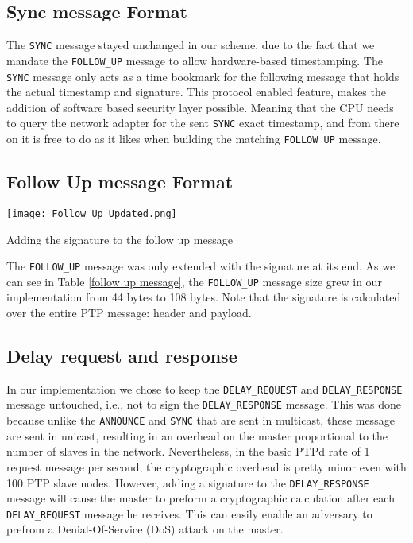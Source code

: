 \documentclass[11pt]{article}
\begin{document}
\subsection{Sync message Format}\label{sol:sync}

The \texttt{SYNC} message stayed unchanged in our scheme, due to the fact that we mandate the \texttt{FOLLOW_UP} message to allow hardware-based timestamping. The \texttt{SYNC} message only acts as a time bookmark for the following message that holds the actual timestamp and signature. This protocol enabled feature, makes the addition of software based security layer possible. Meaning that the CPU needs to query the network adapter for the sent \texttt{SYNC} exact timestamp, and from there on it is free to do as it likes when building the matching \texttt{FOLLOW_UP} message.



\subsection{Follow Up message Format}\label{sol:fu}



\begin{table}[t]

\centerline{\texttt{[image: Follow\_Up\_Updated.png]}}

\caption{Adding the signature to the follow up message}

\label{follow up message}

\end{table}



The \texttt{FOLLOW_UP} message was only extended with the signature at its end. As we can see in Table \ref{follow up message}, the \texttt{FOLLOW_UP} message size grew in our implementation from 44 bytes to 108 bytes. Note that the signature is calculated over the entire PTP message: header and payload.



\subsection{Delay request and response}\label{sol:delay}

In our implementation we chose to keep the \texttt{DELAY_REQUEST} and \texttt{DELAY_RESPONSE} message untouched, i.e., not to sign the \texttt{DELAY_RESPONSE} message. This was done because unlike the \texttt{ANNOUNCE} and \texttt{SYNC} that are sent in multicast, these message are sent in unicast, resulting in an overhead on the master proportional to the number of slaves in the network. Nevertheless, in the basic PTPd rate of 1 request message per second, the cryptographic overhead is pretty minor even with 100 PTP slave nodes. However, adding a signature to the \texttt{DELAY_RESPONSE} message will cause the master to preform a cryptographic calculation after each \texttt{DELAY_REQUEST} message he receives. This can easily enable an adversary to prefrom a Denial-Of-Service (DoS) attack on the master.
\end{document}
